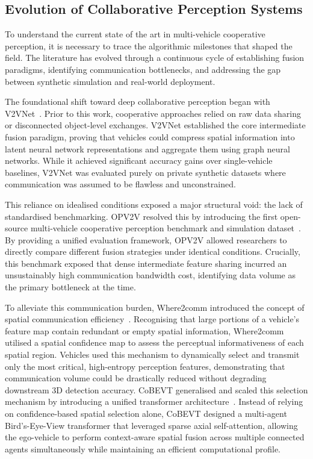 \subsection{Evolution of Collaborative Perception Systems}

To understand the current state of the art in multi-vehicle cooperative
perception, it is necessary to trace the algorithmic milestones that shaped the
field. The literature has evolved through a continuous cycle of establishing
fusion paradigms, identifying communication bottlenecks, and addressing the gap
between synthetic simulation and real-world deployment.

The foundational shift toward deep collaborative perception began with
V2VNet~\cite{wang2020v2vnet}. Prior to this work, cooperative approaches relied on
raw data sharing or disconnected object-level exchanges. V2VNet established the
core intermediate fusion paradigm, proving that vehicles could compress spatial
information into latent neural network representations and aggregate them using
graph neural networks. While it achieved significant accuracy gains over
single-vehicle baselines, V2VNet was evaluated purely on private synthetic
datasets where communication was assumed to be flawless and unconstrained.

This reliance on idealised conditions exposed a major structural void: the lack of
standardised benchmarking. OPV2V resolved this by introducing the first
open-source multi-vehicle cooperative perception benchmark and simulation
dataset~\cite{xu2022opv2v}. By providing a unified evaluation framework, OPV2V
allowed researchers to directly compare different fusion strategies under
identical conditions. Crucially, this benchmark exposed that dense intermediate
feature sharing incurred an unsustainably high communication bandwidth cost,
identifying data volume as the primary bottleneck at the time.

To alleviate this communication burden, Where2comm introduced the concept of
spatial communication efficiency~\cite{hu2022}. Recognising that large portions of
a vehicle's feature map contain redundant or empty spatial information, Where2comm
utilised a spatial confidence map to assess the perceptual informativeness of each
spatial region. Vehicles used this mechanism to dynamically select and transmit
only the most critical, high-entropy perception features, demonstrating that
communication volume could be drastically reduced without degrading downstream 3D
detection accuracy. CoBEVT generalised and scaled this selection mechanism by
introducing a unified transformer architecture~\cite{xu2022cobevt}. Instead of
relying on confidence-based spatial selection alone, CoBEVT designed a multi-agent
Bird's-Eye-View transformer that leveraged sparse axial self-attention, allowing
the ego-vehicle to perform context-aware spatial fusion across multiple connected
agents simultaneously while maintaining an efficient computational profile.

